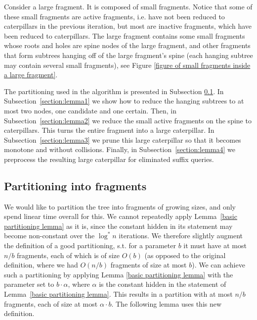 \documentclass[a4paper,UKenglish]{lipics-v2016}
\theoremstyle{plain}
\begin{document}
Consider a large fragment. It is composed of small fragments. Notice that some of these small fragments are active fragments, i.e. have not been reduced to caterpillars in the previous iteration, but most are inactive fragments, which have
been reduced to caterpillars. The large fragment contains some small fragments whose roots and holes are spine nodes of the large fragment,
and other fragments that form subtrees hanging off of the large fragment's spine (each hanging subtree may
contain several small fragments), see Figure \ref{figure of small fragments inside a large fragment}.



\noindent The partitioning used in the algorithm is presented in Subsection \ref{section:partioioning}. In Subsection~\ref{section:lemma1} we show how to reduce the hanging subtrees to at most two nodes, one candidate and one certain. Then, in Subsection~\ref{section:lemma2} we reduce the small active fragments on the spine to caterpillars. This turns the entire fragment into a large caterpillar. In Subsection~\ref{section:lemma3} we prune this large caterpillar so that it becomes monotone and without collisions. Finally, in Subsection~\ref{section:lemma4} we preprocess the resulting large caterpillar for eliminated suffix queries. 

\subsection{Partitioning into fragments}\label{section:partioioning}
We would like to partition the tree into fragments of growing sizes, and only spend linear time overall for this. We cannot repeatedly apply Lemma~\ref{basic partitioning lemma} as it is, since the constant hidden in its statement may become non-constant over the $\log^*n$ iterations. We therefore slightly augment the definition of a good partitioning, s.t. for a parameter $b$ it must have at most $n/b$ fragments, each of which is of size $O(b)$ (as opposed to the original definition, where we had $O(n/b)$ fragments of size at most $b$). We can achieve such a partitioning by applying Lemma \ref{basic partitioning lemma} with the parameter set to $b \cdot \alpha$, where $\alpha$ is the constant hidden in the statement of Lemma~\ref{basic partitioning lemma}. This results in a partition with at most $n/b$ fragments, each of size at most $\alpha \cdot b$. The following lemma uses this new definition.
\end{document}

